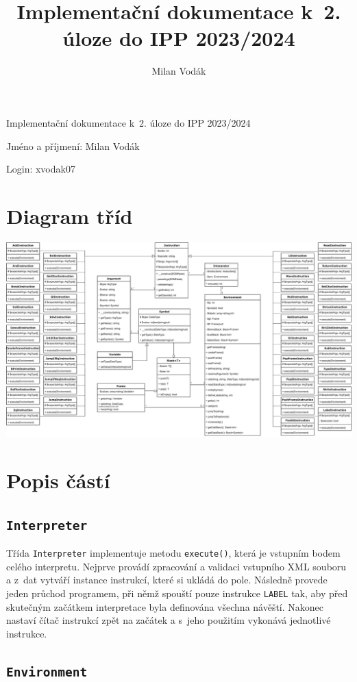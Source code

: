 \documentclass{article}[a4paper]
\title{Implementační dokumentace k~2. úloze do IPP 2023/2024}
\author{Milan Vodák}
\begin{document}
    \begin{center}
        {\Large Implementační dokumentace k~2. úloze do IPP 2023/2024}

        Jméno a příjmení: Milan Vodák

        Login: xvodak07
    \end{center}

    \section{Diagram tříd}

    \begin{center}
        \includegraphics[width=\textwidth]{class-diagram.pdf}
    \end{center}

    \section{Popis částí}

    \subsection{\texttt{Interpreter}}

    Třída \texttt{Interpreter} implementuje metodu \texttt{execute()}, která je vstupním bodem celého interpretu.
    Nejprve provádí zpracování a validaci vstupního XML souboru a z~dat vytváří instance instrukcí, které si ukládá do pole.
    Následně provede jeden průchod programem, při němž spouští pouze instrukce \texttt{LABEL} tak, aby před skutečným začátkem interpretace byla definována všechna návěští.
    Nakonec nastaví čítač instrukcí zpět na začátek a s~jeho použitím vykonává jednotlivé instrukce.

    \subsection{\texttt{Environment}}
\end{document}
